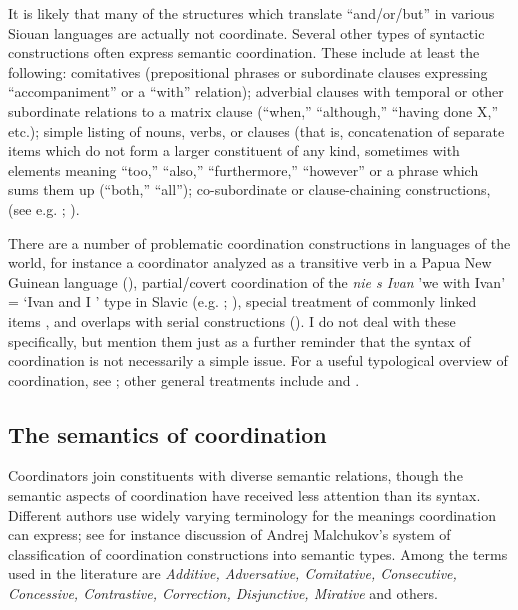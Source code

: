 \documentclass[output=paper]{LSP/langsci}
\begin{document}
It is likely that many of the structures which translate ``and/or/but'' in various Siouan languages are actually not coordinate. Several other types of syntactic constructions often express semantic coordination. These include at least the following:  comitatives (prepositional phrases or subordinate clauses expressing ``accompaniment'' or a ``with'' relation);  adverbial clauses with temporal or other subordinate relations to a matrix clause (``when,'' ``although,'' ``having done X,'' etc.);  simple listing of nouns, verbs, or clauses (that is, concatenation of separate items which do not form a larger constituent of any kind, sometimes with elements meaning ``too,'' ``also,'' ``furthermore,'' ``however'' or a phrase which sums them up (``both,'' ``all'');  co-subordinate or clause-chaining constructions, (see e.g. \citealt{Graczyk2007}; \citealt{Boyle2007}).

There are a number of problematic coordination constructions in languages of the world, for instance a coordinator analyzed as a transitive verb in a Papua New Guinean language (\citealt{BrownDryer2009}), partial/covert coordination of the \textit{nie s Ivan} 'we with Ivan' = `Ivan and I ' type in Slavic (e.g. \citealt{McNally1993}; \citealt{Larson2014}), special treatment of commonly linked items \citep{Walchli2005}, and overlaps with serial constructions (\citealt{Carstens2002}). I do not deal with these specifically, but mention them just as a further reminder that the syntax of coordination is not necessarily a simple issue. For a useful typological overview of coordination, see \citet{Haspelmath2007}; other general treatments include \citet{Johannessen1998} and  \citet{VanOirsouw1987}. 

\subsection{The semantics of coordination}

Coordinators join constituents with diverse semantic relations, though the semantic aspects of coordination have received less attention than its syntax. Different authors use widely varying terminology for the meanings coordination can express; see for instance  discussion of Andrej Malchukov's system of classification of coordination constructions into semantic types. Among the terms used in the literature are \textit{Additive, Adversative, Comitative, Consecutive, Concessive, Contrastive, Correction, Disjunctive, Mirative} and others.
\end{document}
